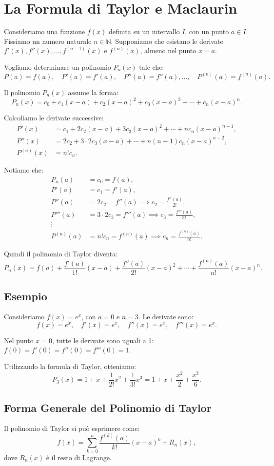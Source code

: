 \documentclass[a4paper,12pt]{article}
\begin{document}
\section*{La Formula di Taylor e Maclaurin}

Consideriamo una funzione \( f(x) \) definita su un intervallo \( I \), con un punto \( a \in I \). Fissiamo un numero naturale \( n \in \mathbb{N} \). Supponiamo che esistano le derivate \( f'(x), f''(x), \ldots, f^{(n-1)}(x) \) e \( f^{(n)}(x) \), almeno nel punto \( x = a \). 

Vogliamo determinare un polinomio \( P_n(x) \) tale che:
\[
P(a) = f(a), \quad P'(a) = f'(a), \quad P''(a) = f''(a), \ldots, \quad P^{(n)}(a) = f^{(n)}(a).
\]

Il polinomio \( P_n(x) \) assume la forma:
\[
P_n(x) = c_0 + c_1(x-a) + c_2(x-a)^2 + c_3(x-a)^3 + \cdots + c_n(x-a)^n.
\]

Calcoliamo le derivate successive:
\begin{align*}
P'(x) &= c_1 + 2c_2(x-a) + 3c_3(x-a)^2 + \cdots + n c_n (x-a)^{n-1}, \\
P''(x) &= 2c_2 + 3 \cdot 2 c_3(x-a) + \cdots + n(n-1)c_n (x-a)^{n-2}, \\
P^{(n)}(x) &= n! c_n.
\end{align*}

Notiamo che:
\begin{align*}
P_n(a) &= c_0 = f(a), \\
P'(a) &= c_1 = f'(a), \\
P''(a) &= 2c_2 = f''(a) \implies c_2 = \frac{f''(a)}{2!}, \\
P'''(a) &= 3 \cdot 2 c_3 = f'''(a) \implies c_3 = \frac{f'''(a)}{3!}, \\
\vdots \\
P^{(n)}(a) &= n! c_n = f^{(n)}(a) \implies c_n = \frac{f^{(n)}(a)}{n!}.
\end{align*}

Quindi il polinomio di Taylor diventa:
\[
P_n(x) = f(a) + \frac{f'(a)}{1!}(x-a) + \frac{f''(a)}{2!}(x-a)^2 + \cdots + \frac{f^{(n)}(a)}{n!}(x-a)^n.
\]

\subsection*{Esempio}

Consideriamo \( f(x) = e^x \), con \( a = 0 \) e \( n = 3 \). Le derivate sono:
\[
f(x) = e^x, \quad f'(x) = e^x, \quad f''(x) = e^x, \quad f'''(x) = e^x.
\]

Nel punto \( x = 0 \), tutte le derivate sono uguali a 1: \( f(0) = f'(0) = f''(0) = f'''(0) = 1 \).

Utilizzando la formula di Taylor, otteniamo:
\[
P_3(x) = 1 + x + \frac{1}{2!}x^2 + \frac{1}{3!}x^3 = 1 + x + \frac{x^2}{2} + \frac{x^3}{6}.
\]

\subsection*{Forma Generale del Polinomio di Taylor}

Il polinomio di Taylor si può esprimere come:
\[
f(x) = \sum_{k=0}^n \frac{f^{(k)}(a)}{k!}(x-a)^k + R_n(x),
\]
dove \( R_n(x) \) è il resto di Lagrange.
\end{document}
